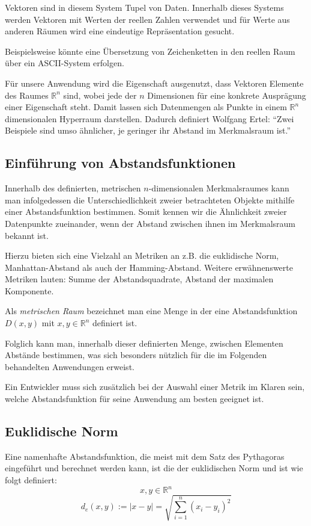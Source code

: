 \documentclass[fontsize=11pt]{scrartcl}
\begin{document}
                Vektoren sind in diesem System Tupel von Daten. Innerhalb dieses Systems werden Vektoren mit Werten der reellen Zahlen verwendet und für Werte aus anderen Räumen wird eine eindeutige Repräsentation gesucht.\par Beispielsweise könnte eine Übersetzung von Zeichenketten in den reellen Raum über ein ASCII-System erfolgen.\par 
                Für unsere Anwendung wird die Eigenschaft ausgenutzt, dass Vektoren Elemente des Raumes $\mathbb{R}^n$ sind, wobei jede der $n$ Dimensionen für eine konkrete Ausprägung einer Eigenschaft steht. Damit lassen sich Datenmengen als Punkte in einem $\mathbb{R}^n$ dimensionalen Hyperraum darstellen. Dadurch definiert Wolfgang Ertel: “Zwei Beispiele sind umso ähnlicher, je geringer ihr Abstand im Merkmalsraum ist.”\cite[S. 207]{ertel2016} %
            \subsection{Einführung von Abstandsfunktionen}
                Innerhalb des definierten, metrischen $n$-dimensionalen Merkmalsraumes kann man infolgedessen die Unterschiedlichkeit zweier betrachteten Objekte mithilfe einer Abstandsfunktion bestimmen. Somit kennen wir die Ähnlichkeit zweier Datenpunkte zueinander, wenn der Abstand zwischen ihnen im Merkmalsraum bekannt ist.\par Hierzu bieten sich eine Vielzahl an Metriken an z.B. die euklidische Norm, Manhattan-Abstand als auch der Hamming-Abstand. Weitere erwähnenswerte Metriken lauten: Summe der Abstandsquadrate, Abstand der maximalen Komponente.\par 
                Als \emph{metrischen Raum} bezeichnet man eine Menge in der eine Abstandsfunktion $D(x,y)$ mit $x,y \in \mathbb{R}^n$ definiert ist.\par
                Folglich kann man, innerhalb dieser definierten Menge, zwischen Elementen Abstände bestimmen, was sich besonders nützlich für die im Folgenden behandelten Anwendungen erweist. \par
                Ein Entwickler muss sich zusätzlich bei der Auswahl einer Metrik im Klaren sein, welche Abstandsfunktion für seine Anwendung am besten geeignet ist.
            \subsection{Euklidische Norm}
                Eine namenhafte Abstandsfunktion, die meist mit dem Satz des Pythagoras eingeführt und berechnet werden kann, ist die der euklidischen Norm und ist wie folgt definiert:
                $$
                    x,y \in \mathbb{R}^n
                $$
                $$
                    d_e(x,y):= |x - y| = \sqrt{\sum_{i=1}^{n}(x_i -y_i)^2}
                $$
\end{document}
